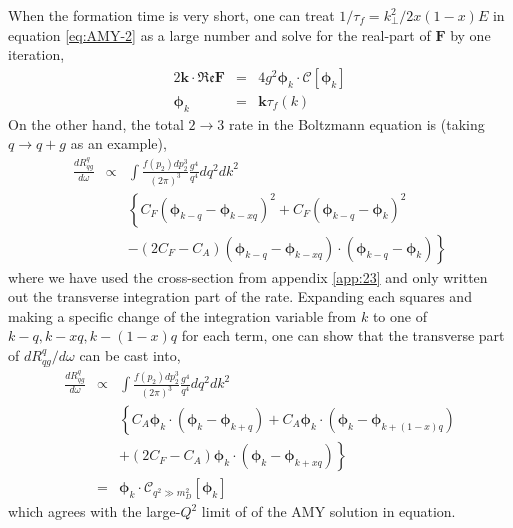 \documentclass[aps, prc, reprint, amsmath, groupedaddress, nofootinbib]{revtex4-1}
\begin{document}
When the formation time is very short, one can treat $1/\tau_f = k_\perp^2/2x(1-x)E$ in equation \ref{eq:AMY-2} as a large number and solve for the real-part of $\mathbf{F}$ by one iteration,
\begin{eqnarray}
2\mathbf{k}\cdot\mathfrak{Re} \mathbf{F} &=& 4 g^2 \mathbf{\phi}_k\cdot \mathcal{C}[\mathbf{\phi}_k] \\
\mathbf{\phi}_k &=& \mathbf{k}\tau_f(k)
\end{eqnarray}
On the other hand, the total $2\rightarrow 3$ rate in the Boltzmann equation is (taking $q\rightarrow q+g$ as an example),
\begin{eqnarray}
\frac{dR^{q}_{qg}}{d\omega} &\propto&  \int  \frac{f(p_2)dp_2^3}{(2\pi)^3}  \frac{g^4}{q^4} dq^2 d k^2\\\nonumber
&& \left\{
C_F\left( \mathbf{\phi}_{k-q}-\mathbf{\phi}_{k-xq} \right)^2
+ C_F\left( \mathbf{\phi}_{k-q}-\mathbf{\phi}_{k} \right)^2\right.\\\nonumber
&&\left.
- (2C_F-C_A)\left( \mathbf{\phi}_{k-q}-\mathbf{\phi}_{k-xq} \right)\cdot \left( \mathbf{\phi}_{k-q}-\mathbf{\phi}_{k} \right)
\right\}
\end{eqnarray}
where we have used the cross-section from appendix \ref{app:23} and only written out the transverse integration part of the rate.
Expanding each squares and making a specific change of the integration variable from $k$ to one of $k-q, k-xq, k-(1-x)q$ for each term, one can show that the transverse part of $dR^{q}_{qg}/d\omega$ can be cast into,
\begin{eqnarray}
\frac{dR^{q}_{qg}}{d\omega} &\propto& \int  \frac{f(p_2)dp_2^3}{(2\pi)^3} \frac{g^4}{q^4} d q^2 dk^2\\\nonumber
&& \left\{
C_A\mathbf{\phi}_{k}\cdot \left( \mathbf{\phi}_{k}-\mathbf{\phi}_{k+q} \right)
+C_A\mathbf{\phi}_{k} \cdot \left( \mathbf{\phi}_k - \mathbf{\phi}_{k+(1-x)q}\right) \right.\\\nonumber
&&\left.+(2C_F-C_A)\mathbf{\phi}_{k} \cdot \left(\mathbf{\phi}_k-\mathbf{\phi}_{k+xq} \right)
\right\} \\
&=&  \mathbf{\phi}_k \cdot \mathcal{C}_{q^2\gg m_D^2}[\mathbf{\phi}_k]
\end{eqnarray}
which agrees with the large-$Q^2$ limit of of the AMY solution in equation. 
\end{document}
